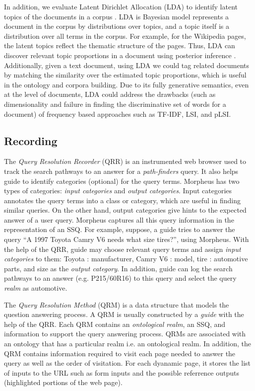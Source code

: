 In addition, we evaluate Latent Dirichlet Allocation (LDA) to identify latent topics of the documents in a corpus \cite{Blei2003latentdirichlet}.  LDA is Bayesian model represents a document in the corpus by distributions over topics, and a topic itself is a distribution over all  terms in the corpus.  For example, for the Wikipedia pages, the latent topics reflect the thematic structure of the pages. Thus, LDA can discover relevant topic proportions in a document using posterior inference \cite{Blei2003latentdirichlet}. Additionally, given a text document, using LDA we could tag related documents by matching the similarity over the estimated topic proportions, which is useful in the ontology and corpora building.  Due to its fully generative semantics, even at the level of documents, LDA could address the drawbacks (such as dimensionality and failure in finding the discriminative set of words for a document) of frequency based approaches such as TF-IDF, LSI, and pLSI.


\subsection{ Recording}
\label{sec:query_processing}
  
The \emph{Query Resolution Recorder} (QRR) is an instrumented web browser
used to track the search pathways to an answer for a \textit{path-finders} query. It
also helps guide to identify categories (optional) for the query terms. 
Morpheus has two types of categories: \emph{input categories} and \emph{output categories}.
Input categories annotates the query terms into a class or category, which are 
useful in finding similar queries. On the other hand, output categories give hints
to the expected answer of a user query. Morpheus captures all
this query information in the representation of an SSQ. For example, suppose, a guide 
tries to answer the query ``A 1997 Toyota Camry V6 needs what size tires?'', using
Morpheus. With the help of the QRR, guide may choose relevant query terms and assign
\emph{input categories} to them: Toyota : manufacturer, Camry V6 : 
model, tire : automotive parts, and size as the \emph{output category}. 
In addition, guide can log the search pathways to an answer (e.g. P215/60R16)
to this query and select the query \emph{realm} as automotive.      


The \emph{Query Resolution Method} (QRM) is a data structure that models the
question answering process. A QRM is usually constructed by a \emph{guide} with
the help of the QRR. Each QRM contains an \emph{ontological realm}, an SSQ, and
information to support the query answering process. QRMs are associated with an
ontology that has a particular realm i.e. an ontological realm. In addition, 
the QRM contains information required to visit each page needed to 
answer the query as well as the order of visitation. For each
dyanamic page, it stores the list of inputs to the URL such as form inputs and
the possible referrence outputs (highlighted portions of the web page).


